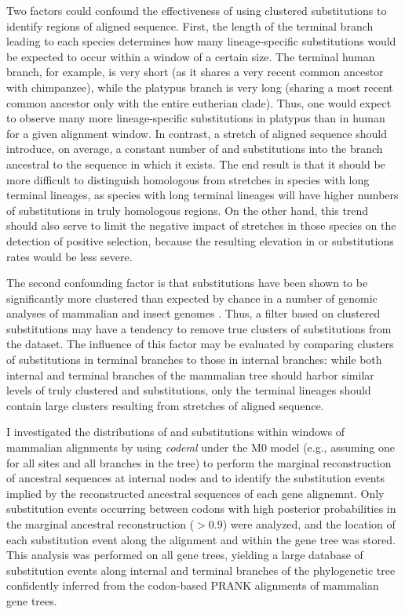 Two factors could confound the effectiveness of using clustered
substitutions to identify regions of \nhom aligned sequence. First,
the length of the terminal branch leading to each species determines
how many lineage-specific substitutions would be expected to occur
within a window of a certain size. The terminal human branch, for
example, is very short (as it shares a very recent common ancestor
with chimpanzee), while the platypus branch is very long (sharing a
most recent common ancestor only with the entire eutherian
clade). Thus, one would expect to observe many more lineage-specific
substitutions in platypus than in human for a given alignment
window. In contrast, a stretch of \nhom aligned sequence should
introduce, on average, a constant number of \nsyn and \syn
substitutions into the branch ancestral to the sequence in which it
exists. The end result is that it should be more difficult to
distinguish homologous from \nhom stretches in species with long
terminal lineages, as species with long terminal lineages will have
higher numbers of substitutions in truly homologous regions. On the
other hand, this trend should also serve to limit the negative impact
of \nhom stretches in those species on the detection of positive
selection, because the resulting elevation in \nsyn or \syn
substitutions rates would be less severe.

The second confounding factor is that \nsyn substitutions have been
shown to be significantly more clustered than expected by chance in a
number of genomic analyses of mammalian and insect genomes
\citep{Callahan2011,Bazykin2004,Wang2007}. Thus, a filter based on
clustered \nsyn substitutions may have a tendency to remove true
clusters of \nsyn substitutions from the dataset. The influence of
this factor may be evaluated by comparing clusters of substitutions in
terminal branches to those in internal branches: while both internal
and terminal branches of the mammalian tree should harbor similar
levels of truly clustered \nsyn and \syn substitutions, only the
terminal lineages should contain large clusters resulting from
stretches of aligned \nhom sequence.

I investigated the distributions of \nsyn and \syn substitutions
within windows of mammalian alignments by using \emph{codeml}
\citep{Yang2007} under the M0 model (e.g., assuming one \omg for all
sites and all branches in the tree) to perform the marginal
reconstruction of ancestral sequences at internal nodes
\citep{Yang1995} and to identify the substitution events implied by
the reconstructed ancestral sequences of each gene alignemnt. Only
substitution events occurring between codons with high posterior
probabilities in the marginal ancestral reconstruction ($>0.9$) were
analyzed, and the location of each substitution event along the
alignment and within the gene tree was stored. This analysis was
performed on all gene trees, yielding a large database of substitution
events along internal and terminal branches of the phylogenetic tree
confidently inferred from the codon-based PRANK alignments of
mammalian gene trees.

